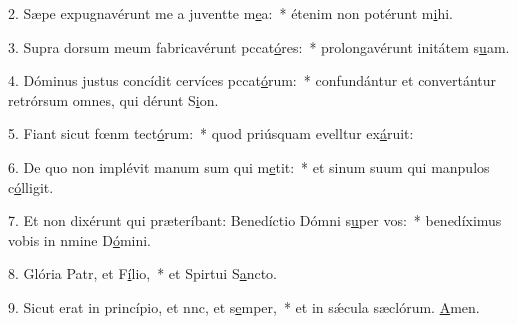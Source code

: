 2. Sæpe expugnavérunt me a juventte m\uline{e}a:~* étenim non potérunt m\uline{i}hi.\par 
3. Supra dorsum meum fabricavérunt pccat\uline{ó}res:~* prolongavérunt initátem s\uline{u}am.\par 
4. Dóminus justus concídit cervíces pccat\uline{ó}rum:~* confundántur et convertántur retrórsum omnes, qui dérunt S\uline{i}on.\par 
5. Fiant sicut fœnm tect\uline{ó}rum:~* quod priúsquam evelltur ex\uline{á}ruit:\par 
6. De quo non implévit manum sum qui m\uline{e}tit:~* et sinum suum qui manpulos c\uline{ó}lligit.\par 
7. Et non dixérunt qui præteríbant: Benedíctio Dómni s\uline{u}per vos:~* benedíximus vobis in nmine D\uline{ó}mini.\par 
8. Glória Patr, et F\uline{í}lio,~* et Spirtui S\uline{a}ncto.\par 
9. Sicut erat in princípio, et nnc, et s\uline{e}mper,~* et in sǽcula sæclórum. \uline{A}men.\par 
